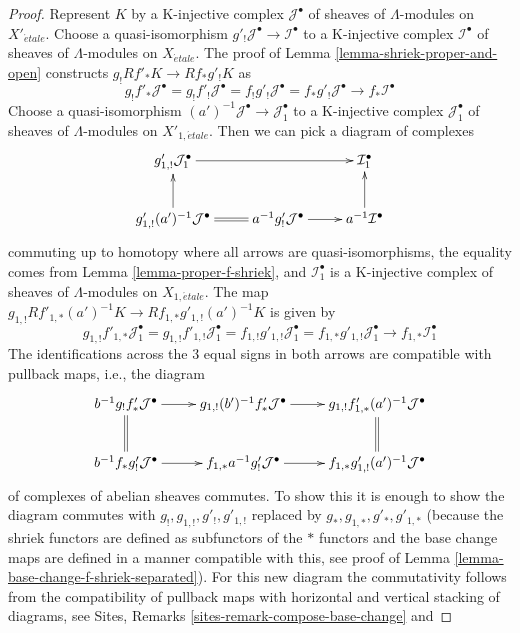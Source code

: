 \documentclass{stacks-project}
\theoremstyle{plain}
\theoremstyle{definition}
\theoremstyle{remark}
\numberwithin{equation}{subsection}
\def\etale{{\acute{e}tale}}
\begin{document}
\begin{proof}
Represent $K$ by a K-injective complex $\mathcal{J}^\bullet$ of
sheaves of $\Lambda$-modules on $X'_\etale$. Choose a quasi-isomorphism
$g'_!\mathcal{J}^\bullet \to \mathcal{I}^\bullet$ to a
K-injective complex $\mathcal{I}^\bullet$ of
sheaves of $\Lambda$-modules on $X_\etale$.
The proof of Lemma \ref{lemma-shriek-proper-and-open}
constructs $g_!Rf'_*K \to Rf_*g'_!K$ as
$$
g_!f'_*\mathcal{J}^\bullet =
g_!f'_!\mathcal{J}^\bullet =
f_!g'_!\mathcal{J}^\bullet =
f_*g'_!\mathcal{J}^\bullet \to
f_*\mathcal{I}^\bullet
$$
Choose a quasi-isomorphism
$(a')^{-1}\mathcal{J}^\bullet \to \mathcal{J}_1^\bullet$
to a K-injective complex $\mathcal{J}_1^\bullet$ of
sheaves of $\Lambda$-modules on $X'_{1, \etale}$.
Then we can pick a diagram of complexes
$$
\xymatrix{
g'_{1, !}\mathcal{J}_1^\bullet \ar[rr] & &
\mathcal{I}_1^\bullet \\
g'_{1, !}(a')^{-1}\mathcal{J}^\bullet \ar[u] \ar@{=}[r] &
a^{-1}g'_!\mathcal{J}^\bullet \ar[r] &
a^{-1}\mathcal{I}^\bullet \ar[u]
}
$$
commuting up to homotopy where all arrows are quasi-isomorphisms, the
equality comes from Lemma \ref{lemma-proper-f-shriek},
and $\mathcal{I}_1^\bullet$ is a K-injective complex of sheaves of
$\Lambda$-modules on $X_{1, \etale}$. The map
$g_{1, !}Rf'_{1, *}(a')^{-1}K \to Rf_{1, *}g'_{1, !}(a')^{-1}K$ is given by
$$
g_{1, !}f'_{1, *}\mathcal{J}_1^\bullet =
g_{1, !}f'_{1, !}\mathcal{J}_1^\bullet =
f_{1, !}g'_{1, !}\mathcal{J}_1^\bullet =
f_{1, *}g'_{1, !}\mathcal{J}_1^\bullet \to
f_{1, *}\mathcal{I}_1^\bullet
$$
The identifications across the $3$ equal signs in both arrows
are compatible with pullback maps, i.e., the diagram
$$
\xymatrix{
b^{-1}g_!f'_*\mathcal{J}^\bullet \ar@{=}[d] \ar[r] &
g_{1, !}(b')^{-1}f'_*\mathcal{J}^\bullet \ar[r] &
g_{1, !}f'_{1, *}(a')^{-1}\mathcal{J}^\bullet \ar@{=}[d] \\
b^{-1}f_*g'_!\mathcal{J}^\bullet \ar[r] &
f_{1, *}a^{-1}g'_!\mathcal{J}^\bullet \ar[r] &
f_{1, *}g'_{1, !}(a')^{-1}\mathcal{J}^\bullet
}
$$
of complexes of abelian sheaves commutes. To show this it is enough to
show the diagram commutes with $g_!, g_{1, !}, g'_!, g'_{1, !}$
replaced by $g_*, g_{1, *}, g'_*, g'_{1, *}$ (because the shriek
functors are defined as subfunctors of the $*$ functors and the
base change maps are defined in a manner compatible with this, see
proof of Lemma \ref{lemma-base-change-f-shriek-separated}).
For this new diagram the commutativity follows from the compatibility
of pullback maps with horizontal and vertical stacking of diagrams, see
Sites, Remarks \ref{sites-remark-compose-base-change} and

\end{proof}
\end{document}
